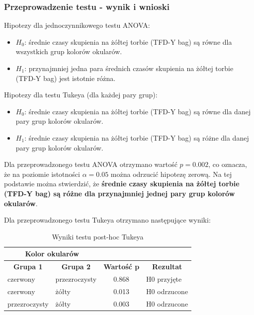         \subsubsection{Przeprowadzenie testu - wynik i wnioski}
        Hipotezy dla jednoczynnikowego testu ANOVA:
        \begin{itemize}
            \item $H_0$: średnie czasy skupienia na żółtej torbie (TFD-Y bag) są równe dla wszystkich grup kolorów okularów.
            \item $H_1$: przynajmniej jedna para średnich czasów skupienia na żółtej torbie (TFD-Y bag) jest istotnie różna.
        \end{itemize}

        Hipotezy dla testu Tukeya (dla każdej pary grup):
        \begin{itemize}
            \item $H_0$: średnie czasy skupienia na żółtej torbie (TFD-Y bag) są równe dla danej pary grup kolorów okularów.
            \item $H_1$: średnie czasy skupienia na żółtej torbie (TFD-Y bag) są różne dla danej pary grup kolorów okularów.
        \end{itemize}

        Dla przeprowadzonego testu ANOVA otrzymano wartość $p=0.002$, co oznacza, że na poziomie istotności $\alpha=0.05$
        można odrzucić hipotezę zerową. Na tej podstawie można stwierdzić, że \textbf{średnie czasy skupienia na żółtej torbie (TFD-Y bag) są różne dla przynajmniej jednej pary grup kolorów okularów}.

        Dla przeprowadzonego testu Tukeya otrzymano następujące wyniki:
        \begin{table}[H]
            \centering
            \caption{Wyniki testu post-hoc Tukeya}
             \begin{tabular}{|ll|cl}
            \cline{1-2}
            \multicolumn{2}{|c|}{\textbf{Kolor   okularów}}                                         & \textbf{}                               & \multicolumn{1}{c}{\textbf{}}          \\ \hline
            \multicolumn{1}{|c|}{\textbf{Grupa 1}} & \multicolumn{1}{c|}{\textbf{Grupa 2}} & \multicolumn{1}{c|}{\textbf{Wartość p}} & \multicolumn{1}{c|}{\textbf{Rezultat}} \\ \hline
            \multicolumn{1}{|l|}{czerwony}         & przezroczysty                         & \multicolumn{1}{c|}{0.868}              & \multicolumn{1}{l|}{H0 przyjęte}       \\ \hline
            \multicolumn{1}{|l|}{czerwony}         & żółty                                 & \multicolumn{1}{c|}{0.013}              & \multicolumn{1}{l|}{H0 odrzucone}      \\ \hline
            \multicolumn{1}{|l|}{przezroczysty}    & żółty                                 & \multicolumn{1}{c|}{0.003}              & \multicolumn{1}{l|}{H0 odrzucone}      \\ \hline
            \end{tabular}
            \label{tab:Tukeya}
        \end{table}


